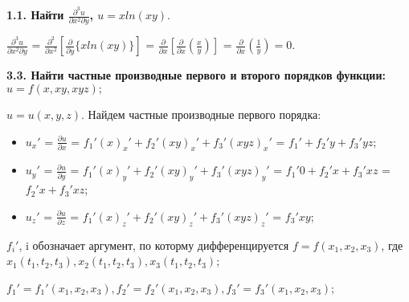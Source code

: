 \documentclass{article}
\begin{document}
\noindent \textbf{1.1. Найти $\frac{\partial^3 u}{\partial x^2 \partial y}$, $u = x ln(xy).$}
\vspace{1mm}

$\frac{\partial^3 u}{\partial x^2 \partial y}$ = $\frac{\partial^2}{\partial x^2}[\frac{\partial}{\partial y}\{x ln(xy)\}]$ = $\frac{\partial}{\partial x}[\frac{\partial}{\partial x}(\frac{x}{y})]$ = 
$\frac{\partial}{\partial x}(\frac{1}{y}) = 0$.
\vspace{3mm}

\noindent \textbf{3.3. Найти частные производные первого и второго порядков функции: $u = f(x,xy,xyz);$}

$u = u(x,y,z)$. Найдем частные производные первого порядка: 
\begin{itemize}
\item $u_x'$ = $\frac{\partial u}{\partial x}$ = $f_1'(x)_x' + f_2'(xy)_x' + f_3'(xyz)_x'$ = $f_1' + f_2'y + f_3'yz$;
\item $u_y'$ = $\frac{\partial u}{\partial y}$ = $f_1'(x)_y' + f_2'(xy)_y' + f_3'(xyz)_y'$ = $f_1'0 + f_2'x + f_3'xz$ = $f_2'x + f_3'xz$;
\item $u_z'$ = $\frac{\partial u}{\partial z}$ = $f_1'(x)_z' + f_2'(xy)_z' + f_3'(xyz)_z'$ = $f_3'xy$;
\end{itemize}

$f_i'$, i обозначает аргумент, по которму дифференцируется $f=f(x_1,x_2,x_3)$, где $x_1(t_1,t_2,t_3), x_2(t_1,t_2,t_3), x_3(t_1,t_2,t_3)$;
\vspace{1mm}

$f_1'=f_1'(x_1,x_2,x_3), f_2'=f_2'(x_1,x_2,x_3), f_3'=f_3'(x_1,x_2,x_3)$;
\end{document}

